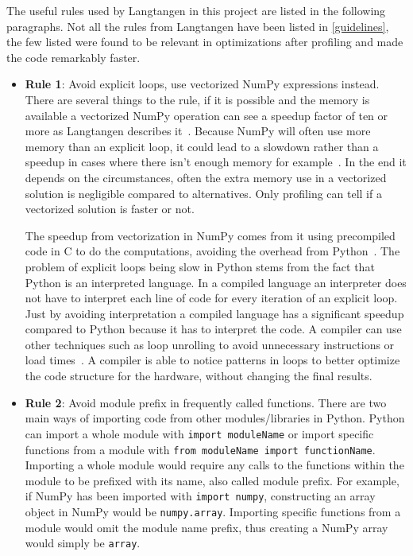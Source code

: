 \documentclass[12pt, a4paper]{article}
\begin{document}
The useful rules used by Langtangen in this project are listed in the following paragraphs.
Not all the rules from Langtangen have been listed in \cref{guidelines}, the few listed were found to be relevant in optimizations after profiling and made the code remarkably faster.
\begin{itemize}\label{guidelines}
    \item \textbf{Rule 1}: Avoid explicit loops, use vectorized NumPy expressions instead.
    There are several things to the rule, if it is possible and the memory is available a vectorized NumPy operation can see a speedup factor of ten or more as Langtangen describes it~\cite{NumpyArray}.
    Because NumPy will often use more memory than an explicit loop, it could lead to a slowdown rather than a speedup in cases where there isn't enough memory for example~\cite{Numpy:Vectorization}.
    In the end it depends on the circumstances, often the extra memory use in a vectorized solution is negligible compared to alternatives.
    Only profiling can tell if a vectorized solution is faster or not.
    
    The speedup from vectorization in NumPy comes from it using precompiled code in C to do the computations, avoiding the overhead from Python~\cite{Numpy:Fast}.
    The problem of explicit loops being slow in Python stems from the fact that Python is an interpreted language.
    In a compiled language an interpreter does not have to interpret each line of code for every iteration of an explicit loop.
    Just by avoiding interpretation a compiled language has a significant speedup compared to Python because it has to interpret the code.
    A compiler can use other techniques such as loop unrolling to avoid unnecessary instructions or load times~\cite{wiki:LoopUnroll}.
    A compiler is able to notice patterns in loops to better optimize the code structure for the hardware, without changing the final results.

    \item \textbf{Rule 2}: Avoid module prefix in frequently called functions.
    There are two main ways of importing code from other modules/libraries in Python.
    Python can import a whole module with \texttt{import moduleName} or import specific functions from a module with \texttt{from moduleName import functionName}.
    Importing a whole module would require any calls to the functions within the module to be prefixed with its name, also called module prefix.
    For example, if NumPy has been imported with \texttt{import numpy}, constructing an array object in NumPy would be \texttt{numpy.array}.
    Importing specific functions from a module would omit the module name prefix, thus creating a NumPy array would simply be \texttt{array}.
    

\end{itemize}
\end{document}
